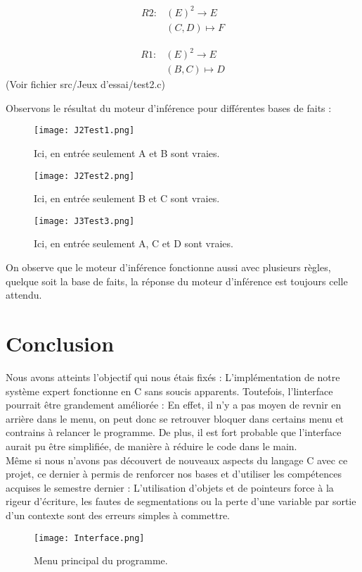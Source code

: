 \documentclass{article}
\begin{document}
\begin{align*}
    R2 : &(E)^2 \longrightarrow E\\ 
    &(C,D) \longmapsto F
\end{align*}

\begin{align*}
    R1 : &(E)^2 \longrightarrow E\\ 
    &(B,C) \longmapsto D
\end{align*}
(Voir fichier src/Jeux d'essai/test2.c)\\
\clearpage


Observons le résultat du moteur d'inférence pour différentes bases de faits :

\begin{figure}[h]
\centerline{\texttt{[image: J2Test1.png]}}
\caption{Ici, en entrée seulement A et B sont vraies.}
\label{Test3}
\end{figure}

\begin{figure}[h]
\centerline{\texttt{[image: J2Test2.png]}}
\caption{Ici, en entrée seulement B et C sont vraies.}
\label{Test4}
\end{figure}

\begin{figure}[h]
\centerline{\texttt{[image: J3Test3.png]}}
\caption{Ici, en entrée seulement A, C et D sont vraies.}
\label{Test5}
\end{figure}
On  observe que le moteur d'inférence fonctionne aussi avec plusieurs règles, quelque soit la base de faits, la réponse du moteur d'inférence est toujours celle attendu. 
\clearpage
\section{Conclusion}
Nous avons atteints l'objectif qui nous étais fixés : L'implémentation de notre système expert fonctionne en C sans soucis apparents. Toutefois, l'linterface pourrait être grandement améliorée : En effet, il n'y a pas moyen de revnir en arrière dans le menu, on peut donc se retrouver bloquer dans certains menu et contrains à relancer le programme.
De plus, il est fort probable que l'interface aurait pu être simplifiée, de manière à réduire le code dans le main.\\
Même si nous n'avons pas découvert de nouveaux aspects du langage C avec ce projet, ce dernier à permis de renforcer nos bases et d'utiliser les compétences acquises le semestre dernier : L'utilisation d'objets et de pointeurs force à la rigeur d'écriture, les fautes de segmentations ou la perte d'une variable par sortie d'un contexte sont des erreurs simples à commettre.

\begin{figure}[h]
\centerline{\texttt{[image: Interface.png]}}
\caption{Menu principal du programme.}
\label{Interface}
\end{figure}
\end{document}
